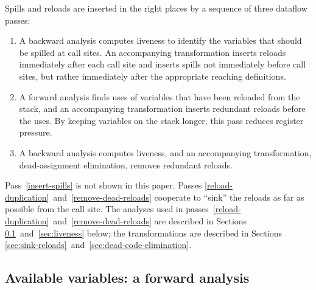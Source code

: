 \documentclass[blockstyle,preprint,nocopyrightspace]{sigplanconf}
\newcommand{\authornote}[1]{{\em #1}}
\def\authornote#1{\unskip\relax}
\newcommand{\simon}[1]{\authornote{SLPJ: #1}}
\newcommand\secreftwo[2]{Sections \ref{sec:#1}~and~\ref{sec:#2}}
\newcommand\seclabel[1]{\label{sec:#1}}
\begin{document}
Spills and reloads are inserted in the right places
by a sequence of three dataflow passes:
\begin{enumerate}
\item
\label{insert-spills}
A backward analysis computes liveness
to identify the variables that should be spilled at call sites.
An accompanying transformation inserts reloads immediately after each call
site and inserts spills not immediately before call sites, but
rather immediately after the appropriate reaching definitions.
\item
\label{reload-duplication}
A forward analysis finds uses of variables that have been reloaded
from the stack, and an accompanying transformation
inserts redundant reloads before the uses.
By keeping variables on the stack longer, this pass reduces register pressure.
\item
\label{remove-dead-reloads}
A backward analysis computes liveness,
and an accompanying transformation, dead-assignment elimination,
removes redundant reloads.
\end{enumerate}
Pass~\ref{insert-spills} is not shown in this paper.
Passes
\ref{reload-duplication}~and~\ref{remove-dead-reloads} cooperate to ``sink''
the reloads as far as possible from the call site.
The analyses used in
passes~\ref{reload-duplication}~and~\ref{remove-dead-reloads}
are described in \secreftwo{avail}{liveness} below;
the transformations are described in
\secreftwo{sink-reloads}{dead-code-elimination}.




\subsection{Available variables: a forward analysis} 

\seclabel{avail}
\end{document}
